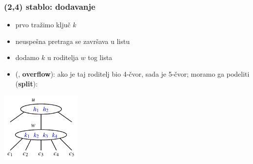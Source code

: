 \documentclass[compress,aspectratio=169]{beamer}
\begin{document}
\begin{frame}[fragile]
  \frametitle{(2,4) stablo: dodavanje}
  \begin{itemize}
    \item prvo tražimo ključ $k$
    \item neuspešna pretraga se završava u listu
    \item dodamo $k$ u roditelja $w$ tog lista 
    \item (, \textbf{overflow}): ako je taj roditelj bio 4-čvor, sada je 5-čvor; moramo ga podeliti (\textbf{split}):
  \end{itemize}
  \begin{center}
    \includegraphics[width=4cm]{asp-11-pic31.pdf}
  \end{center}
\end{frame}
\end{document}

